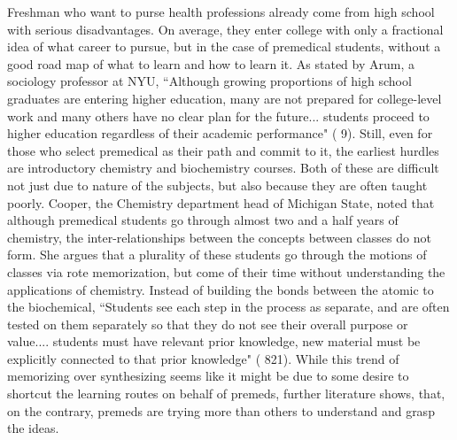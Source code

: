 \documentclass [12pt]{article}
\begin{document}
\begin{flushleft}
Freshman who want to purse health professions already come from high school with serious disadvantages. On average, they enter college with only a fractional idea of what career to pursue, but in the case of premedical students, without a good road map of what to learn and how to learn it. As stated by Arum, a sociology professor at NYU, {``}Although growing proportions of high school graduates are entering higher education, many are not prepared for college-level work and many others have no clear plan for the future... students proceed to higher education regardless of their academic performance" (\cite{Arum-2011} 9). Still, even for those who select premedical as their path and commit to it, the earliest hurdles are introductory chemistry and biochemistry courses. Both of these are difficult not just due to nature of the subjects, but also because they are often taught poorly. Cooper, the Chemistry department head of Michigan State, noted that although premedical students go through almost two and a half years of chemistry, the inter-relationships between the concepts between classes do not form. She argues that a plurality of these students go through the motions of classes via rote memorization, but come of their time without understanding the applications of chemistry. Instead of building the bonds between the atomic to the biochemical, {``}Students see each step in the process as separate, and are often tested on them separately so that they do not see their overall purpose or value.... students must have relevant prior knowledge, new material must be explicitly connected to that prior knowledge" (\cite{Cooper-2013} 821). While this trend of memorizing over synthesizing seems like it might be due to some desire to shortcut the learning routes on behalf of premeds, further literature shows, that, on the contrary, premeds are trying more than others to understand and grasp the ideas.



\end{flushleft}
\end{document}
